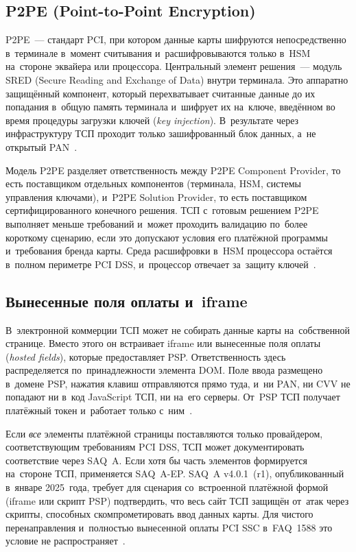 \subsection*{P2PE (Point-to-Point Encryption)}

P2PE~--- стандарт PCI, при котором данные карты шифруются непосредственно
в~терминале в~момент считывания и~расшифровываются только в~HSM на~стороне
эквайера или процессора. Центральный элемент решения~--- модуль SRED (Secure
Reading and Exchange of Data) внутри терминала. Это аппаратно защищённый
компонент, который перехватывает считанные данные до их попадания в~общую
память терминала
и~шифрует их на~ключе, введённом во время процедуры загрузки ключей (\textit{key injection}).
В~результате через инфраструктуру ТСП проходит только зашифрованный блок данных,
а~не открытый PAN~\cite{pci-p2pe}.

Модель P2PE разделяет ответственность между P2PE Component
Provider, то есть поставщиком отдельных компонентов (терминала, HSM, системы
управления ключами), и~P2PE Solution Provider, то есть поставщиком
сертифицированного конечного решения. ТСП с~готовым решением P2PE выполняет
меньше требований и~может проходить валидацию по~более короткому сценарию,
если это допускают условия его платёжной программы и~требования бренда карты.
Среда расшифровки в~HSM процессора остаётся в~полном периметре PCI DSS,
и~процессор отвечает за~защиту ключей~\cite{pci-p2pe}.

\subsection*{Вынесенные поля оплаты и~iframe}

В~электронной коммерции ТСП может не собирать данные карты на~собственной
странице. Вместо этого он встраивает iframe или вынесенные поля оплаты
(\textit{hosted fields}), которые предоставляет PSP. Ответственность здесь распределяется
по~принадлежности элемента DOM. Поле ввода размещено в~домене PSP, нажатия
клавиш отправляются прямо туда, и~ни PAN, ни CVV не попадают ни в~код JavaScript
ТСП, ни на~его серверы. От~PSP ТСП получает платёжный токен и~работает только
с~ним~\cite{pci-dss-4}.

Если \emph{все} элементы платёжной страницы поставляются только провайдером,
соответствующим требованиям PCI DSS, ТСП может документировать соответствие
через SAQ~A. Если
хотя бы часть элементов формируется на~стороне ТСП, применяется SAQ~A-EP.
SAQ~A v4.0.1~(r1), опубликованный в~январе 2025~года, требует для сценария
со~встроенной платёжной формой (iframe или скрипт PSP) подтвердить, что весь
сайт ТСП защищён от~атак через скрипты, способных скомпрометировать ввод данных
карты. Для чистого перенаправления и~полностью вынесенной оплаты PCI SSC в~FAQ~1588
это условие не
распространяет~\cite{pci-saq-a-r1-2025,pci-faq-1588,pci-faq-1291,pci-faq-1293}.

